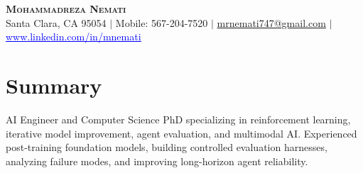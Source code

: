\documentclass[letterpaper,13pt]{article}
\begin{document}
\begin{center}
    \textbf{\LARGE \scshape Mohammadreza Nemati} \\ \vspace{1pt}
    \small Santa Clara, CA 95054 $|$ Mobile: 567-204-7520 $|$
    \href{mailto:mrnemati747@gmail.com}{mrnemati747@gmail.com} $|$
    \href{https://www.linkedin.com/in/mnemati/}{\textcolor{blue}{\underline{www.linkedin.com/in/mnemati}}}
\end{center}

\section{Summary}
\small{AI Engineer and Computer Science PhD specializing in reinforcement learning, iterative model improvement, agent evaluation, and multimodal AI. Experienced post-training foundation models, building controlled evaluation harnesses, analyzing failure modes, and improving long-horizon agent reliability.}
\vspace{0.05cm}
\end{document}
